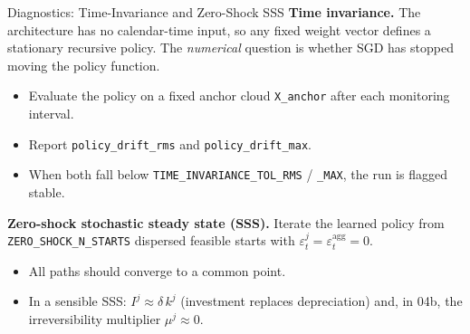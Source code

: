 \documentclass[aspectratio=169,11pt]{beamer}
\newcommand{\emphc}[1]{\textcolor{harvardcrimson}{#1}}
\begin{document}
\begin{frame}{Diagnostics: Time-Invariance and Zero-Shock SSS}
\textbf{Time invariance.}  The architecture has no calendar-time input, so any fixed weight vector defines a stationary recursive policy.  The \emph{numerical} question is whether SGD has stopped moving the policy function.

\vspace{0.2em}
\begin{itemize}
    \item Evaluate the policy on a fixed anchor cloud \texttt{X\_anchor} after each monitoring interval.
    \item Report \texttt{policy\_drift\_rms} and \texttt{policy\_drift\_max}.
    \item When both fall below \texttt{TIME\_INVARIANCE\_TOL\_RMS} / \texttt{\_MAX}, the run is flagged \emphc{stable}.
\end{itemize}

\vspace{0.3em}
\textbf{Zero-shock stochastic steady state (SSS).}  Iterate the learned policy from \texttt{ZERO\_SHOCK\_N\_STARTS} dispersed feasible starts with $\varepsilon^j_t = \varepsilon^{\mathrm{agg}}_t = 0$.

\vspace{0.2em}
\begin{itemize}
    \item All paths should converge to a common point.
    \item In a sensible SSS: $I^j \approx \delta\,k^j$ (investment replaces depreciation) and, in 04b, the irreversibility multiplier $\mu^j \approx 0$.
\end{itemize}
\end{frame}
\end{document}
